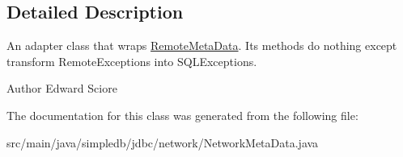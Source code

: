 \subsection{Detailed Description}
An adapter class that wraps \hyperlink{interfacesimpledb_1_1jdbc_1_1network_1_1RemoteMetaData}{Remote\+Meta\+Data}. Its methods do nothing except transform Remote\+Exceptions into S\+Q\+L\+Exceptions. \begin{DoxyAuthor}{Author}
Edward Sciore 
\end{DoxyAuthor}


The documentation for this class was generated from the following file\+:\begin{DoxyCompactItemize}
\item 
src/main/java/simpledb/jdbc/network/Network\+Meta\+Data.\+java\end{DoxyCompactItemize}
